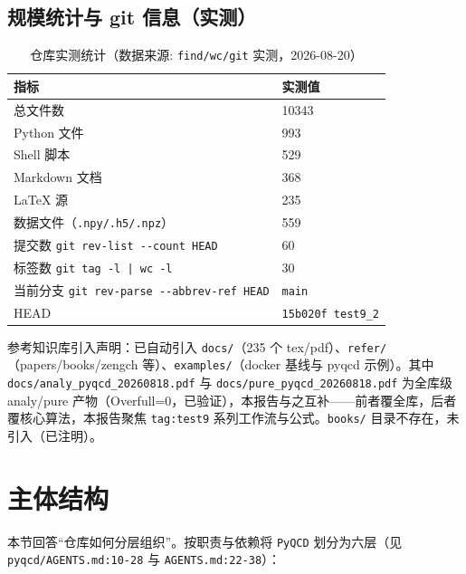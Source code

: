 \documentclass[UTF8]{ctexart}
\begin{document}
\subsection{规模统计与 git 信息（实测）}
\begin{table}[htbp]\centering
\begin{tabular}{ll}
\toprule
指标 & 实测值 \\
\midrule
总文件数 & 10343 \\
Python 文件 & 993 \\
Shell 脚本 & 529 \\
Markdown 文档 & 368 \\
LaTeX 源 & 235 \\
数据文件（\texttt{\nolinkurl{.npy/.h5/.npz}}） & 559 \\
提交数 \texttt{\nolinkurl{git rev-list --count HEAD}} & 60 \\
标签数 \texttt{\nolinkurl{git tag -l | wc -l}} & 30 \\
当前分支 \texttt{\nolinkurl{git rev-parse --abbrev-ref HEAD}} & \texttt{\nolinkurl{main}} \\
HEAD & \texttt{\nolinkurl{15b020f test9\_2}} \\
\bottomrule
\end{tabular}
\caption{仓库实测统计（数据来源: \texttt{\nolinkurl{find/wc/git}} 实测，2026-08-20）}
\end{table}

参考知识库引入声明：已自动引入 \texttt{\nolinkurl{docs/}}（235 个 tex/pdf）、\texttt{\nolinkurl{refer/}}（papers/books/zengch 等）、\texttt{\nolinkurl{examples/}}（docker 基线与 pyqcd 示例）。其中 \texttt{\nolinkurl{docs/analy\_pyqcd\_20260818.pdf}} 与 \texttt{\nolinkurl{docs/pure\_pyqcd\_20260818.pdf}} 为全库级 analy/pure 产物（Overfull=0，已验证），本报告与之互补——前者覆全库，后者覆核心算法，本报告聚焦 \texttt{\nolinkurl{tag:test9}} 系列工作流与公式。\texttt{\nolinkurl{books/}} 目录不存在，未引入（已注明）。

\section{主体结构}
\label{sec:struct}
本节回答“仓库如何分层组织”。按职责与依赖将 \texttt{\nolinkurl{PyQCD}} 划分为六层（见 \texttt{\nolinkurl{pyqcd/AGENTS.md:10-28}} 与 \texttt{\nolinkurl{AGENTS.md:22-38}}）：
\end{document}
